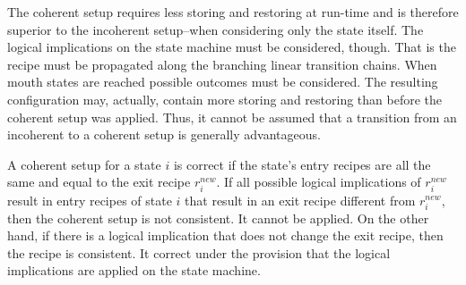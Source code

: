 \documentclass[12pt,a4paper]{scrartcl}
\begin{document}
The coherent setup requires less storing and restoring at run-time and is
therefore superior to the incoherent setup--when considering only the state
itself. The logical implications on the state machine must be considered,
though.  That is the recipe must be propagated along the branching linear
transition chains.  When mouth states are reached possible outcomes must be
considered. The resulting configuration may, actually, contain more storing and
restoring than before the coherent setup was applied.  Thus, it cannot be
assumed that a transition from an incoherent to a coherent setup is generally
advantageous.

A coherent setup for a state $i$ is correct if the state's entry recipes are
all the same and equal to the exit recipe $r^{new}_i$. If all possible logical implications
of $r^{new}_i$ result in entry recipes of state $i$ that result in an exit
recipe different from $r^{new}_i$, then the coherent setup is not consistent.
It cannot be applied. On the other hand, if there is a logical implication that
does not change the exit recipe, then the recipe is consistent.  It correct
under the provision that the logical implications are applied on the state
machine.
\end{document}
